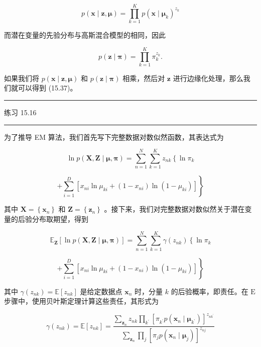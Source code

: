 \documentclass[10pt]{article}
\newcommand{\HRule}{\begin{center}\rule{0.9\linewidth}{0.2mm}\end{center}}
\begin{document}
\[
p\left( {\mathbf{x} \mid  \mathbf{z},\mathbf{\mu }}\right)  = \mathop{\prod }\limits_{{k = 1}}^{K}p{\left( \mathbf{x} \mid  {\mathbf{\mu }}_{k}\right) }^{{z}_{k}} \tag{15.42}
\]

而潜在变量的先验分布与高斯混合模型的相同，因此

\[
p\left( {\mathbf{z} \mid  \mathbf{\pi }}\right)  = \mathop{\prod }\limits_{{k = 1}}^{K}{\pi }_{k}^{{z}_{k}}. \tag{15.43}
\]

如果我们将 \(p\left( {\mathbf{x} \mid  \mathbf{z},\mathbf{\mu }}\right)\) 和 \(p\left( {\mathbf{z} \mid  \mathbf{\pi }}\right)\) 相乘，然后对 \(\mathbf{z}\) 进行边缘化处理，那么我们就可以得到 (15.37)。

\HRule

练习 15.16

\HRule

为了推导 EM 算法，我们首先写下完整数据对数似然函数，其表达式为

\[
\ln p\left( {\mathbf{X},\mathbf{Z} \mid  \mathbf{\mu },\mathbf{\pi }}\right)  = \mathop{\sum }\limits_{{n = 1}}^{N}\mathop{\sum }\limits_{{k = 1}}^{K}{z}_{nk}\left\{  {\ln {\pi }_{k}}\right.
\]

\[
\left. {+\mathop{\sum }\limits_{{i = 1}}^{D}\left\lbrack  {{x}_{ni}\ln {\mu }_{ki} + \left( {1 - {x}_{ni}}\right) \ln \left( {1 - {\mu }_{ki}}\right) }\right\rbrack  }\right\}   \tag{15.44}
\]

其中 \(\mathbf{X} = \left\{  {\mathbf{x}}_{n}\right\}\) 和 \(\mathbf{Z} = \left\{  {\mathbf{z}}_{n}\right\}\) 。接下来，我们对完整数据对数似然关于潜在变量的后验分布取期望，得到

\[
{\mathbb{E}}_{\mathbf{Z}}\left\lbrack  {\ln p\left( {\mathbf{X},\mathbf{Z} \mid  \mathbf{\mu },\mathbf{\pi }}\right) }\right\rbrack   = \mathop{\sum }\limits_{{n = 1}}^{N}\mathop{\sum }\limits_{{k = 1}}^{K}\gamma \left( {z}_{nk}\right) \left\{  {\ln {\pi }_{k}}\right.
\]

\[
\left. {+\mathop{\sum }\limits_{{i = 1}}^{D}\left\lbrack  {{x}_{ni}\ln {\mu }_{ki} + \left( {1 - {x}_{ni}}\right) \ln \left( {1 - {\mu }_{ki}}\right) }\right\rbrack  }\right\}   \tag{15.45}
\]

其中 \(\gamma \left( {z}_{nk}\right)  = \mathbb{E}\left\lbrack  {z}_{nk}\right\rbrack\) 是给定数据点 \({\mathbf{x}}_{n}\) 时，分量 \(k\) 的后验概率，即责任。在 \(\mathrm{E}\) 步骤中，使用贝叶斯定理计算这些责任，其形式为

\[
\gamma \left( {z}_{nk}\right)  = \mathbb{E}\left\lbrack  {z}_{nk}\right\rbrack   = \frac{\mathop{\sum }\limits_{{\mathbf{z}}_{n}}{z}_{nk}\mathop{\prod }\limits_{{k}^{\prime }}{\left\lbrack  {\pi }_{{k}^{\prime }}p\left( {\mathbf{x}}_{n} \mid  {\mathbf{\mu }}_{{k}^{\prime }}\right) \right\rbrack  }^{{z}_{n{k}^{\prime }}}}{\mathop{\sum }\limits_{{\mathbf{z}}_{n}}\mathop{\prod }\limits_{j}{\left\lbrack  {\pi }_{j}p\left( {\mathbf{x}}_{n} \mid  {\mathbf{\mu }}_{j}\right) \right\rbrack  }^{{z}_{nj}}}
\]
\end{document}
